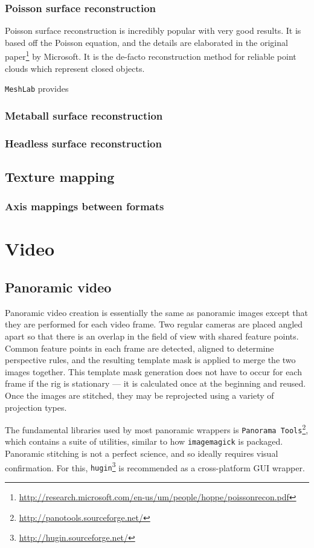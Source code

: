 \documentclass{article}
\begin{document}
\subsubsection{Poisson surface reconstruction}
Poisson surface reconstruction is incredibly popular with very good results. It is based off the Poisson equation, and the details are elaborated in the original paper\footnote{\url{http://research.microsoft.com/en-us/um/people/hoppe/poissonrecon.pdf}} by Microsoft. It is the de-facto reconstruction method for reliable point clouds which represent closed objects.

{\tt MeshLab} provides 
\subsubsection{Metaball surface reconstruction}
\subsubsection{Headless surface reconstruction}
\subsection{Texture mapping}
\subsubsection{Axis mappings between formats}
\section{Video}
\subsection{Panoramic video}
Panoramic video creation is essentially the same as panoramic images except that they are performed for each video frame. Two regular cameras are placed angled apart so that there is an overlap in the field of view with shared feature points. Common feature points in each frame are detected, aligned to determine perspective rules, and the resulting template mask is applied to merge the two images together. This template mask generation does not have to occur for each frame if the rig is stationary --- it is calculated once at the beginning and reused. Once the images are stitched, they may be reprojected using a variety of projection types.

The fundamental libraries used by most panoramic wrappers is {\tt Panorama Tools}\footnote{\url{http://panotools.sourceforge.net/}}, which contains a suite of utilities, similar to how {\tt imagemagick} is packaged. Panoramic stitching is not a perfect science, and so ideally requires visual confirmation. For this, {\tt hugin}\footnote{\url{http://hugin.sourceforge.net/}} is recommended as a cross-platform GUI wrapper.
\end{document}
